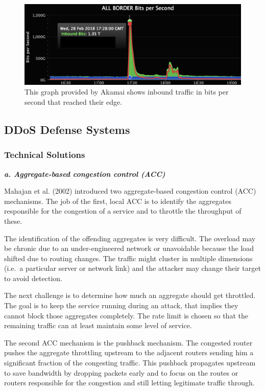 \begin{figure}[ht]
\begin{center} \includegraphics[scale=0.3]{Talk11/github} \end{center}
\caption{This graph provided by Akamai shows inbound traffic in bits per second that reached their edge.\cite{Kottler18}}
\label{fig:github}
\end{figure}

\subsection{DDoS Defense Systems}
\subsubsection{Technical Solutions}
\textbf{\textit{a. Aggregate-based congestion control (ACC)}}

Mahajan et al. (2002) introduced two aggregate-based congestion control (ACC) mechanisms.
The job of the first, local ACC is to identify the aggregates responsible for the congestion of a service and to throttle the throughput of these.\cite{Mahajan02}

The identification of the offending aggregates is very difficult.
The overload may be chronic due to an under-engineered network or unavoidable because the load shifted due to routing changes.
The traffic might cluster in multiple dimensions (i.e.\ a particular server or network link) and the attacker may change their target to avoid detection.\cite{Mahajan02}

The next challenge is to determine how much an aggregate should get throttled.
The goal is to keep the service running during an attack, that implies they cannot block those aggregates completely.
The rate limit is chosen so that the remaining traffic can at least maintain some level of service.\cite{Mahajan02}

The second ACC mechanism is the pushback mechanism.
The congested router pushes the aggregate throttling upstream to the adjacent routers sending him a significant fraction of the congesting traffic.
This pushback propagates upstream to save bandwidth by dropping packets early and to focus on the routes or routers responsible for the congestion and still letting legitimate traffic through.~\cite{Mahajan02}

